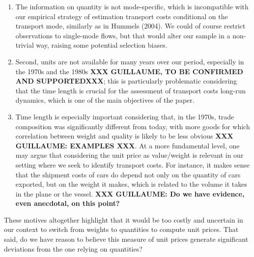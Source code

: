 \documentclass[a4paper,12pt]{article}
\begin{document}
\begin{enumerate}
\item The information on quantity is not mode-specific, which is incompatible with our empirical strategy of estimation transport costs conditional on the transport mode, similarly as in Hummels (2004). We could of course restrict observations to single-mode flows, but that would alter our sample in a non-trivial way, raising some potential selection biases.

\item Second, units are not available for many years over our period, especially in the 1970s and the 1980s \textbf{XXX GUILLAUME, TO BE CONFIRMED AND SUPPORTEDXXX}; this is particularly problematic considering that the time length is crucial for the assessment of transport costs long-run dynamics, which is one of the main objectives of the paper.

\item Time length is especially important considering that, in the 1970s, trade composition was significantly different from today, with more goods for which correlation between weight and quality is likely to be less obvious \textbf{XXX GUILLAUME: EXAMPLES XXX}. At a more fundamental level, one may argue that considering the unit price as value/weight is relevant in our setting where we seek to identify transport costs. For instance, it makes sense that the shipment costs of cars do depend not only on the quantity of cars exported, but on the weight it makes, which is related to the volume it takes in the plane or the vessel. \textbf{XXX GUILLAUME: Do we have evidence, even anecdotal, on this point?}

\end{enumerate}

These motives altogether highlight that it would be too costly and uncertain in our context to switch from weights to quantities to compute unit prices. That said, do we have reason to believe this measure of unit prices generate significant deviations from the one relying on quantities?
\end{document}
